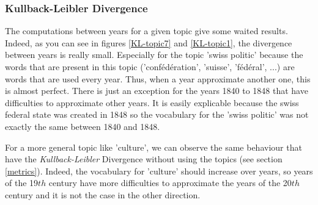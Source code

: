 \subsubsection{Kullback-Leibler Divergence}

The computations between years for a given topic give some waited results. Indeed, as you can see in figures \ref{KL-topic7} and \ref{KL-topic1}, the divergence between years is really small. Especially for the topic 'swiss politic' because the words that are present in this topic ('confédération', 'suisse', 'fédéral', ...) are words that are used every year. Thus, when a year approximate another one, this is almost perfect. There is just an exception for the years 1840 to 1848 that have difficulties to approximate other years. It is easily explicable because the swiss federal state was created in 1848 so the vocabulary for the 'swiss politic' was not exactly the same between 1840 and 1848.

For a more general topic like 'culture', we can observe the same behaviour that have the \emph{Kullback-Leibler} Divergence without using the topics (see section \ref{metrics}). Indeed, the vocabulary for 'culture' should increase over years, so years of the 19$th$ century have more difficulties to approximate the years of the 20$th$ century and it is not the case in the other direction.


